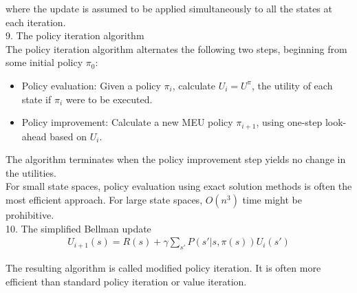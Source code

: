 \documentclass[12pt]{article}
\begin{document}
where the update is assumed to be applied simultaneously to all the states at each iteration. \\

9. The policy iteration algorithm \\

The policy iteration algorithm alternates the following two steps, beginning from some initial policy $\pi_0$:
\begin{itemize}
\item Policy evaluation: Given a policy $\pi_i$, calculate $U_i = U^{\pi}$, the utility of each state if $\pi_i$ were to be executed.
\item Policy improvement: Calculate a new MEU policy $\pi_{i+1}$, using one-step look-ahead based on $U_i$.
\end{itemize}

The algorithm terminates when the policy improvement step yields no change in the utilities. \\

For small state spaces, policy evaluation using exact solution methods is often the most efficient approach. For large state spaces, $O(n^3)$ time might be prohibitive. \\

10. The simplified Bellman update
\begin{eqnarray*}
U_{i+1}(s) = R(s) + \gamma \sum_{s'} P(s' | s, \pi(s)) U_i(s')
\end{eqnarray*}

The resulting algorithm is called modified policy iteration. It is often more efficient than standard policy iteration or value iteration.
\end{document}
